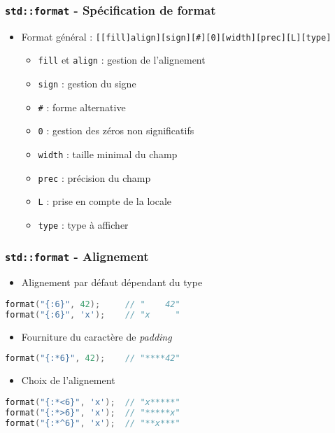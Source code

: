 \documentclass[C++.tex]{subfiles}
\begin{document}
\begin{frame}[fragile]
	\frametitle{\lstinline|std::format| - Spécification de format}
	\begin{itemize}
		\item Format général : \lstinline|[[fill]align][sign][#][0][width][prec][L][type]|
		\begin{itemize}
			\item \lstinline|fill| et \lstinline|align| : gestion de l'alignement
			\item \lstinline|sign| : gestion du signe
			\item \lstinline|#| : forme alternative
			\item \lstinline|0| : gestion des zéros non significatifs
			\item \lstinline|width| : taille minimal du champ
			\item \lstinline|prec| : précision du champ
			\item \lstinline|L| : prise en compte de la locale
			\item \lstinline|type| : type à afficher
		\end{itemize}
	\end{itemize}
\end{frame}

\begin{frame}[fragile]
	\frametitle{\lstinline|std::format| - Alignement}
	\begin{itemize}
		\item Alignement par défaut dépendant du type
	\end{itemize}

	\begin{lstlisting}[language=C++]
format("{:6}", 42);    	// "    42"
format("{:6}", 'x');   	// "x     "\end{lstlisting}

	\begin{itemize}
		\item Fourniture du caractère de \textit{padding}
	\end{itemize}

	\begin{lstlisting}[language=C++]
format("{:*6}", 42);    // "****42"\end{lstlisting}

	\begin{itemize}
		\item Choix de l'alignement
	\end{itemize}

	\begin{lstlisting}[language=C++]
format("{:*<6}", 'x'); 	// "x*****"
format("{:*>6}", 'x'); 	// "*****x"
format("{:*^6}", 'x'); 	// "**x***"\end{lstlisting}
\end{frame}
\end{document}
